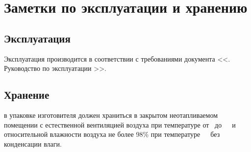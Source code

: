 \newpage

\section{Заметки по эксплуатации и хранению}

	\subsection{Эксплуатация}
		\point Эксплуатация {\genitivecasename} производится в соответствии 
			с требованиями документа <<\nameMain. Руководство по эксплуатации
			\ksauMain[РЭ]>>.

	\subsection{Хранение}
		\point {\nameDevice} в упаковке изготовителя должен 
			храниться в закрытом неотапливаемом помещении 
			с естественной вентиляцией воздуха при температуре 
			от~{\temperaturestoragemin} 
			до~\temperaturestoragemax~\textcelsius\ и относительной 
			влажности воздуха не более 98\% при 
			температуре~\airhumiditywithtemp~\textcelsius\ без конденсации влаги.